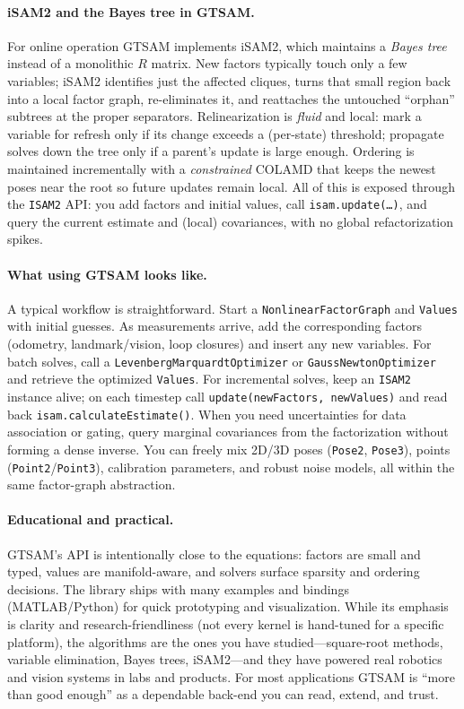 \paragraph{iSAM2 and the Bayes tree in GTSAM.}
For online operation GTSAM implements iSAM2, which maintains a \emph{Bayes tree} instead of a monolithic \(R\) matrix. New factors typically touch only a few variables; iSAM2 identifies just the affected cliques, turns that small region back into a local factor graph, re-eliminates it, and reattaches the untouched “orphan” subtrees at the proper separators. Relinearization is \emph{fluid} and local: mark a variable for refresh only if its change exceeds a (per-state) threshold; propagate solves down the tree only if a parent’s update is large enough. Ordering is maintained incrementally with a \emph{constrained} COLAMD that keeps the newest poses near the root so future updates remain local. All of this is exposed through the \texttt{ISAM2} API: you add factors and initial values, call \texttt{isam.update(\dots)}, and query the current estimate and (local) covariances, with no global refactorization spikes. \cite{iSAM2_paper,Bayes_tree_for_SLAM_paper}

\paragraph{What using GTSAM looks like.}
A typical workflow is straightforward. Start a \texttt{NonlinearFactorGraph} and \texttt{Values} with initial guesses. As measurements arrive, add the corresponding factors (odometry, landmark/vision, loop closures) and insert any new variables. For batch solves, call a \texttt{LevenbergMarquardtOptimizer} or \texttt{GaussNewtonOptimizer} and retrieve the optimized \texttt{Values}. For incremental solves, keep an \texttt{ISAM2} instance alive; on each timestep call \texttt{update(newFactors, newValues)} and read back \texttt{isam.calculateEstimate()}. When you need uncertainties for data association or gating, query marginal covariances from the factorization without forming a dense inverse. You can freely mix 2D/3D poses (\texttt{Pose2}, \texttt{Pose3}), points (\texttt{Point2}/\texttt{Point3}), calibration parameters, and robust noise models, all within the same factor-graph abstraction. \cite{GTSAM_handbook}

\paragraph{Educational and practical.}
GTSAM’s API is intentionally close to the equations: factors are small and typed, values are manifold-aware, and solvers surface sparsity and ordering decisions. The library ships with many examples and bindings (MATLAB/Python) for quick prototyping and visualization. While its emphasis is clarity and research-friendliness (not every kernel is hand-tuned for a specific platform), the algorithms are the ones you have studied—square-root methods, variable elimination, Bayes trees, iSAM2—and they have powered real robotics and vision systems in labs and products. For most applications GTSAM is “more than good enough” as a dependable back-end you can read, extend, and trust. \cite{GTSAM_handbook,iSAM2_paper,Bayes_tree_for_SLAM_paper}

